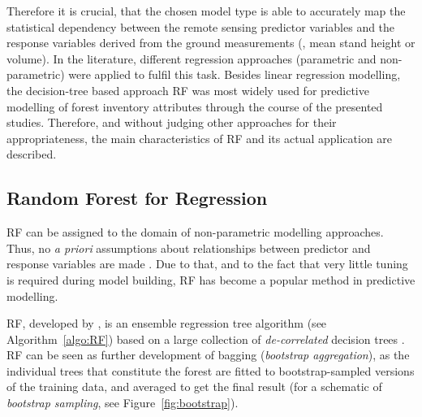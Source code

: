 Therefore 
it is crucial, that the chosen model type is able to accurately map the statistical dependency between the remote sensing predictor variables
and the response variables derived from the ground measurements (\eg, mean stand height or volume).
In the literature, different regression approaches (parametric 
and non-parametric) were applied to fulfil this task. 
Besides linear regression modelling, the decision-tree based approach \acf{RF} 
was most widely used for predictive modelling of 
forest inventory attributes through the course of the presented studies.
Therefore, and without judging other approaches for their appropriateness, the main characteristics of \ac{RF} and its actual application are described.

\subsection{Random Forest for Regression}

\ac{RF} can be assigned to 
the domain of non-parametric modelling approaches.
Thus, no \emph{a priori} assumptions about relationships between predictor and response variables 
are made \parencite{White.2013}.
Due to that, and to the fact that very little tuning is required during model building, \ac{RF} has become a popular method in predictive modelling.

\ac{RF}, developed by \textcite{Breiman.2001}, is an ensemble regression tree algorithm (see Algorithm~\ref{algo:RF}) based on a 
large collection of \emph{de-correlated} decision trees \parencite{Hastie.2009}. 
\ac{RF} 
can be seen as further development of bagging (\emph{bootstrap aggregation}), as the individual trees that constitute the forest are 
fitted to bootstrap-sampled versions of the training data, and averaged to get the final result
(for a schematic of \emph{bootstrap sampling}, see Figure~\ref{fig:bootstrap}).

